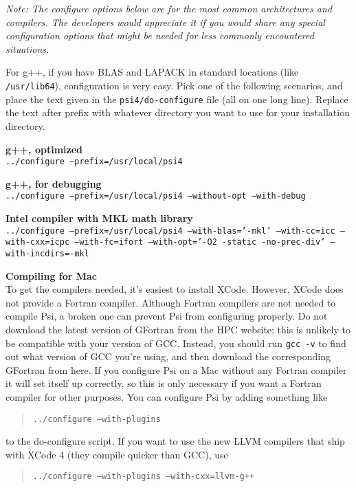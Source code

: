 \documentclass[12pt]{article}
\begin{document}
{\em Note: The configure options below are for the most common
architectures and compilers. The developers would appreciate it if you
would share any special configuration options that might be needed for
less commonly encountered situations.  }

For g++, if you have BLAS and LAPACK in standard locations (like {\tt
/usr/lib64}), configuration is very easy. Pick one of the following
scenarios, and place the text given in the {\tt psi4/do-configure} file
(all on one long line). Replace the text after prefix with whatever
directory you want to use for your installation directory.

\noindent
{\bf g++, optimized} \\
{\tt ../configure --prefix=/usr/local/psi4}

\noindent
{\bf g++, for debugging} \\
{\tt ../configure --prefix=/usr/local/psi4 --without-opt --with-debug}

\pagebreak

\noindent
{\bf Intel compiler with MKL math library} \\
{\tt ../configure --prefix=/usr/local/psi4 --with-blas='-mkl' --with-cc=icc
--with-cxx=icpc --with-fc=ifort  --with-opt='-O2 -static -no-prec-div'
--with-incdirs=-mkl}

\noindent
{\bf Compiling for Mac} \\
To get the compilers needed, it's easiest to install XCode. However, XCode
does not provide a Fortran compiler. Although Fortran compilers are not needed
to compile Psi, a broken one can prevent Psi from configuring properly. Do not
download the latest version of GFortran from the HPC website; this is unlikely
to be compatible with your version of GCC. Instead, you should run {\tt gcc
-v} to find out what version of GCC you're using, and then download the
corresponding GFortran from  here. If you configure Psi on a Mac without any
Fortran compiler it will set itself up correctly, so this is only necessary if
you want a Fortran compiler for other purposes. You can configure Psi by
adding something like
\begin{quotation}
\noindent
{\tt ../configure --with-plugins}
\end{quotation}
to the do-configure script. If you want to use the new LLVM compilers that
ship with XCode 4 (they compile quicker than GCC), use
\begin{quotation}
\noindent
{\tt ../configure --with-plugins --with-cxx=llvm-g++}
\end{quotation}
\end{document}
